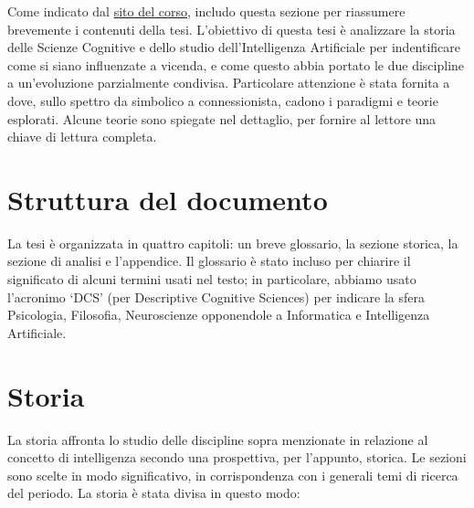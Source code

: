 \documentclass[../main.tex]{subfiles}
\begin{document}
Come indicato dal \href{https://corsi.unibo.it/laurea/informatica/redazione-tesi-voto-finale}{sito del corso}, includo questa sezione per riassumere brevemente i contenuti della tesi.
\vspace{4pt}
L'obiettivo di questa tesi è analizzare la storia delle Scienze Cognitive e dello studio dell'Intelligenza Artificiale per indentificare come si siano influenzate a vicenda, e come questo abbia portato le due discipline a un'evoluzione parzialmente condivisa. Particolare attenzione è stata fornita a dove, sullo spettro da simbolico a connessionista, cadono i paradigmi e teorie esplorati. Alcune teorie sono spiegate nel dettaglio, per fornire al lettore una chiave di lettura completa.

\section{Struttura del documento}
La tesi è organizzata in quattro capitoli: un breve glossario, la sezione storica, la sezione di analisi e l'appendice. Il glossario è stato incluso per chiarire il significato di alcuni termini usati nel testo; in particolare, abbiamo usato l'acronimo `DCS' (per Descriptive Cognitive Sciences) per indicare la sfera Psicologia, Filosofia, Neuroscienze opponendole a Informatica e Intelligenza Artificiale.

\section{Storia}
La storia affronta lo studio delle discipline sopra menzionate in relazione al concetto di intelligenza secondo una prospettiva, per l'appunto, storica. Le sezioni sono scelte in modo significativo, in corrispondenza con i generali temi di ricerca del periodo. La storia è stata divisa in questo modo:
\end{document}
